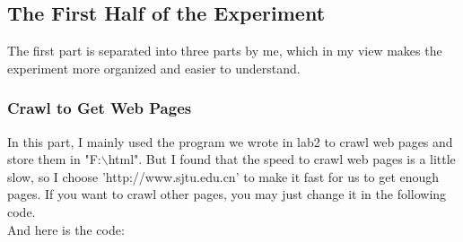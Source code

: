 \documentclass{article}
\begin{document}
\subsection{The First Half of the Experiment}
The first part is separated into three parts by me, which in my view makes the experiment more organized and easier to understand.
\subsubsection{Crawl to Get Web Pages}
In this part, I mainly used the program we wrote in lab2 to crawl web pages and store them in "F:$\backslash$html". But I found that the speed to crawl web pages is a little slow, so I choose 'http://www.sjtu.edu.cn' to make it fast for us to get enough pages. If you want to crawl other pages, you may just change it in the following code.\\
And here is the code:\\
\end{document}
